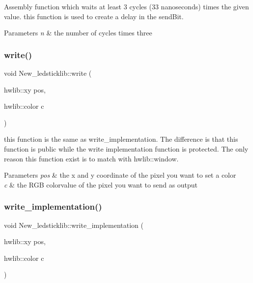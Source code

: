 Assembly function which waits at least 3 cycles (33 nanoseconds) times the given value. this function is used to create a delay in the send\+Bit. 


\begin{DoxyParams}{Parameters}
{\em n} & the number of cycles times three \\
\hline
\end{DoxyParams}
\mbox{\label{class_new__ledsticklib_a63b7399b72c8b72a5b541f0ac66b1f42}} 
\subsubsection{\texorpdfstring{write()}{write()}}
{\footnotesize\ttfamily void New\+\_\+ledsticklib\+::write (\begin{DoxyParamCaption}\item[{hwlib\+::xy}]{pos,  }\item[{hwlib\+::color}]{c }\end{DoxyParamCaption})}



this function is the same as write\+\_\+implementation. The difference is that this function is public while the write implementation function is protected. The only reason this function exist is to match with hwlib\+::window. 


\begin{DoxyParams}{Parameters}
{\em pos} & the x and y coordinate of the pixel you want to set a color \\
\hline
{\em c} & the R\+GB colorvalue of the pixel you want to send as output \\
\hline
\end{DoxyParams}
\mbox{\label{class_new__ledsticklib_a44435a90bf7bdc3bec6c4614da9c089b}} 
\subsubsection{\texorpdfstring{write\_implementation()}{write\_implementation()}}
{\footnotesize\ttfamily void New\+\_\+ledsticklib\+::write\+\_\+implementation (\begin{DoxyParamCaption}\item[{hwlib\+::xy}]{pos,  }\item[{hwlib\+::color}]{c }\end{DoxyParamCaption})\hspace{0.3cm}{\ttfamily [override]}}




